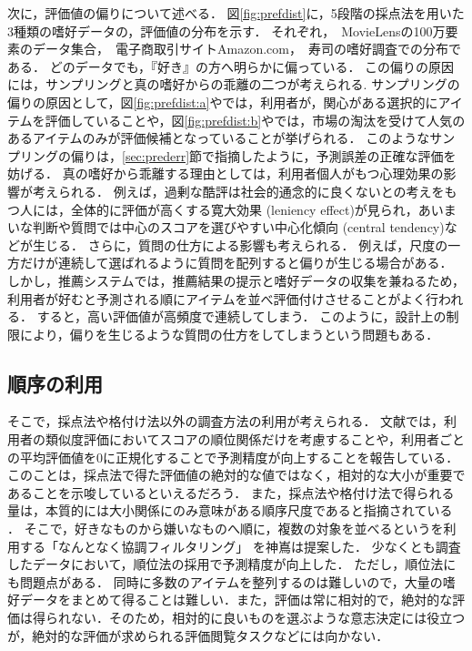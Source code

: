 次に，評価値の偏りについて述べる．
図\ref{fig:prefdist}に，5段階の採点法を用いた3種類の嗜好データの，評価値の分布を示す．
それぞれ，~MovieLensの100万要素のデータ集合\cite{url:008}，~電子商取引サイトAmazon.com\cite{misc:007}，~寿司の嗜好調査\cite{url:020,epublist:064}での分布である．
どのデータでも，『好き』の方へ明らかに偏っている．
この偏りの原因には，サンプリングと真の嗜好からの乖離の二つが考えられる.
サンプリングの偏りの原因として，図\ref{fig:prefdist:a}やでは，利用者が，関心がある選択的にアイテムを評価していることや，図\ref{fig:prefdist:b}やでは，市場の淘汰を受けて人気のあるアイテムのみが評価候補となっていることが挙げられる．
このようなサンプリングの偏りは，\ref{sec:prederr}節で指摘したように，予測誤差の正確な評価を妨げる．
真の嗜好から乖離する理由としては，利用者個人がもつ心理効果の影響が考えられる．
例えば，過剰な酷評は社会的通念的に良くないとの考えをもつ人には，全体的に評価が高くする寛大効果 (leniency effect)が見られ，あいまいな判断や質問では中心のスコアを選びやすい中心化傾向 (central tendency)などが生じる\cite{jb:026:00}．
さらに，質問の仕方による影響も考えられる．
例えば，尺度の一方だけが連続して選ばれるように質問を配列すると偏りが生じる場合がある\cite{jb:022:00}．
しかし，推薦システムでは，推薦結果の提示と嗜好データの収集を兼ねるため，利用者が好むと予測される順にアイテムを並べ評価付けさせることがよく行われる．
すると，高い評価値が高頻度で連続してしまう．
このように，設計上の制限により，偏りを生じるような質問の仕方をしてしまうという問題もある．

\subsection{順序の利用}

そこで，採点法や格付け法以外の調査方法の利用が考えられる．
文献\cite{sigir:99:02}では，利用者の類似度評価においてスコアの順位関係だけを考慮することや，利用者ごとの平均評価値を0に正規化することで予測精度が向上することを報告している．
このことは，採点法で得た評価値の絶対的な値ではなく，相対的な大小が重要であることを示唆しているといえるだろう．
また，採点法や格付け法で得られる量は，本質的には大小関係にのみ意味がある順序尺度\cite{eb:036:00,jj:015}であると指摘されている
\cite{jb:022:00}．
そこで，好きなものから嫌いなものへ順に，複数の対象を並べるというを利用する「なんとなく協調フィルタリング」
\cite{epublist:039,epublist:064}を神嶌は提案した．
少なくとも調査したデータにおいて，順位法の採用で予測精度が向上した．
ただし，順位法にも問題点がある．
同時に多数のアイテムを整列するのは難しいので，大量の嗜好データをまとめて得ることは難しい．また，評価は常に相対的で，絶対的な評価は得られない．そのため，相対的に良いものを選ぶような意志決定には役立つが，絶対的な評価が求められる評価閲覧タスクなどには向かない．

